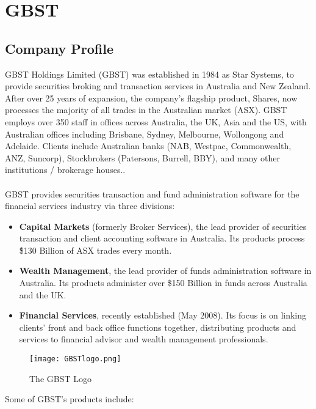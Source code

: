 \chapter{GBST}

\section{Company Profile}

GBST Holdings Limited (GBST) was established in 1984 as Star Systems, to provide securities broking and transaction services in Australia and New Zealand. After over 25 years of expansion, the company's flagship product, Shares, now processes the majority of all trades in the Australian market (ASX). GBST employs over 350 staff in offices across Australia, the UK, Asia and the US, with Australian offices including Brisbane, Sydney, Melbourne, Wollongong and Adelaide. \cite{gbsthistory} Clients include Australian banks (NAB, Westpac, Commonwealth, ANZ, Suncorp), Stockbrokers (Patersons, Burrell, BBY), and many other institutions / brokerage houses.\cite{gbstclients}.
\\
\\
GBST provides securities transaction and fund administration software for the financial services industry via three divisions:

\begin{itemize}
\item \textbf{Capital Markets} (formerly Broker Services), the lead provider of securities transaction and client accounting software in Australia. Its products process \~\$130 Billion of ASX trades every month.
\item \textbf{Wealth Management}, the lead provider of funds administration software in Australia. Its products administer over \$150 Billion in funds across Australia and the UK.
\item \textbf{Financial Services}, recently established (May 2008). Its focus is on linking clients' front and back office functions together, distributing products and services to financial advisor and wealth management professionals.
\end{itemize}

\vspace{0.5cm}
\begin{figure}[ht!]
\centering
\texttt{[image: GBSTlogo.png]}
\caption{The GBST Logo \cite{gbstlogo}}
\label{gbstlogo}
\end{figure}

Some of GBST's products include:

